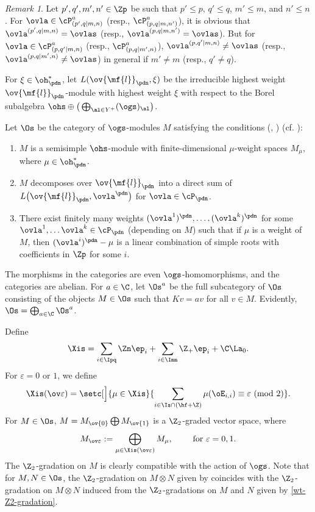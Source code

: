 \documentclass[11pt, reqno]{amsart}
\theoremstyle{definition}
\theoremstyle{remark}
\newtheorem{rem}[thm]{Remark}
\numberwithin{equation}{section}
\begin{document}
\begin{rem}
Let $p',q',m',n' \in \Zp$ be such that $p'\le p$, $q' \le q$, $m' \le m$, and $n' \le n$.
For $\ovla\in \cP_{(p',q|m,n)}^a$ (resp., $\cP_{(p,q|m,n')}^a$), it is obvious that $\ovla^{(p',q|m,n)}=\ovlas$ (resp., $\ovla^{(p,q|m,n')}=\ovlas$).
But for $\ovla\in \cP_{(p,q'|m,n)}^a$ (resp., $\cP_{(p,q|m',n)}^a$), $\ovla^{(p,q'|m,n)}\not=\ovlas$ (resp., $\ovla^{(p,q|m',n)}\not=\ovlas$) in general if $m'\not=m$ (resp., $q'\not=q$).
\end{rem}


For $\xi \in \oh_\pdn^*$, let $L(\ov{\mf{l}}_\pdn, \xi)$ be the irreducible highest weight $\ov{\mf{l}}_\pdn$-module with highest weight $\xi$ with respect to the Borel subalgebra $\ohs \oplus \big( \bigoplus_{ \al \in Y^+ } (\ogs)_\al \big)$.


Let $\Os$ be the category of $\ogs$-modules $M$ satisfying the conditions (\cite[Section II.D]{CCL}, \cite[Section 7]{CLW12}) (cf. \cite{CL10, CLW11}):
\begin{enumerate}[\normalfont(i)]

\item $M$ is a semisimple $\ohs$-module with finite-dimensional $\mu$-weight spaces $M_{\mu}$, where $\mu \in \oh_\pdn^*$.

\item $M$ decomposes over $\ov{\mf{l}}_\pdn$ into a direct sum of $L \big(\ov{\mf{l}}_\pdn, \ovla^\pdn \big)$ for $\ovla \in \cP_\pdn$.

\item There exist finitely many weights $(\ovla^1)^\pdn,\ldots,(\ovla^k)^\pdn$ for some $\ovla^1, \ldots \ovla^k \in \cP_\pdn$ (depending on $M$) such that if $\mu$ is a weight of $M$, then
$(\ovla^i)^\pdn-\mu$ is a linear combination of simple roots with coefficients in $\Zp$ for some $i$.

\end{enumerate}

The morphisms in the categories are even $\ogs$-homomorphisms, and the categories are abelian.
For $a \in \C$, let $\Os^a$ be the full subcategory of $\Os$ consisting of the objects $M \in \Os$ such that $Kv=av$ for all $v \in M$.
Evidently, $\Os =\bigoplus_{a \in \C} \Os^a$.

Define
$$
\Xis= \sum_{i \in \Ipq} \Zn \ep_{i}+ \sum_{i \in \Imn} \Z_+ \ep_i + \C \La_0.
$$
For $\varepsilon=0$ or $1$, we define
$$
{\Xis}(\ov\varepsilon)=
\setc[\Big]{\mu \in {\Xis} }{ \sum_{i \in \Is \cap (\hf+\Z)}\mu(\oE_{i,i})\equiv \varepsilon \,\,(\text{mod }2)}.
$$
For $M\in  \Os$, ${M}={M}_{\ov{0}}\bigoplus {M}_{\ov{1}}$  is a $\Z_2$-graded vector space, where
 \begin{equation}\label{wt-Z2-gradation}
{M}_{\ov\varepsilon}:=\bigoplus_{\mu \in \Xis(\ov\varepsilon)}{M}_{\mu}, \qquad \mbox{ for $\varepsilon= 0, 1.$}
 \end{equation}
The $\Z_2$-gradation on $M$ is clearly compatible with the action of $\ogs$.
Note that for $M, N \in \Os$, the $\Z_2$-gradation on $M\otimes N$ given by  coincides with the $\Z_2$-gradation on $M\otimes N$ induced from the $\Z_2$-gradations on $M$ and $N$ given by \eqref{wt-Z2-gradation}.
\end{document}
